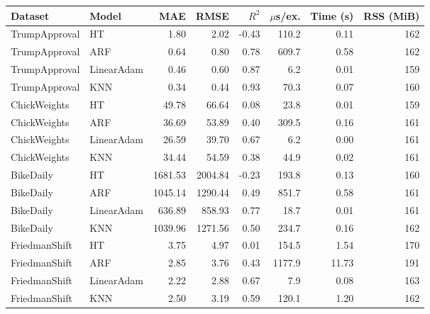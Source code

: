 \begin{tabular}{llrrrrrr}
\toprule
Dataset & Model & MAE & RMSE & $R^2$ & $\mu$s/ex. & Time (s) & RSS (MiB) \\
\midrule
TrumpApproval & HT & 1.80 & 2.02 & -0.43 & 110.2 & 0.11 & 162 \\
TrumpApproval & ARF & 0.64 & 0.80 & 0.78 & 609.7 & 0.58 & 162 \\
TrumpApproval & LinearAdam & 0.46 & 0.60 & 0.87 & 6.2 & 0.01 & 159 \\
TrumpApproval & KNN & 0.34 & 0.44 & 0.93 & 70.3 & 0.07 & 160 \\
ChickWeights & HT & 49.78 & 66.64 & 0.08 & 23.8 & 0.01 & 159 \\
ChickWeights & ARF & 36.69 & 53.89 & 0.40 & 309.5 & 0.16 & 161 \\
ChickWeights & LinearAdam & 26.59 & 39.70 & 0.67 & 6.2 & 0.00 & 161 \\
ChickWeights & KNN & 34.44 & 54.59 & 0.38 & 44.9 & 0.02 & 161 \\
BikeDaily & HT & 1681.53 & 2004.84 & -0.23 & 193.8 & 0.13 & 160 \\
BikeDaily & ARF & 1045.14 & 1290.44 & 0.49 & 851.7 & 0.58 & 161 \\
BikeDaily & LinearAdam & 636.89 & 858.93 & 0.77 & 18.7 & 0.01 & 161 \\
BikeDaily & KNN & 1039.96 & 1271.56 & 0.50 & 234.7 & 0.16 & 162 \\
FriedmanShift & HT & 3.75 & 4.97 & 0.01 & 154.5 & 1.54 & 170 \\
FriedmanShift & ARF & 2.85 & 3.76 & 0.43 & 1177.9 & 11.73 & 191 \\
FriedmanShift & LinearAdam & 2.22 & 2.88 & 0.67 & 7.9 & 0.08 & 163 \\
FriedmanShift & KNN & 2.50 & 3.19 & 0.59 & 120.1 & 1.20 & 162 \\
\bottomrule
\end{tabular}

